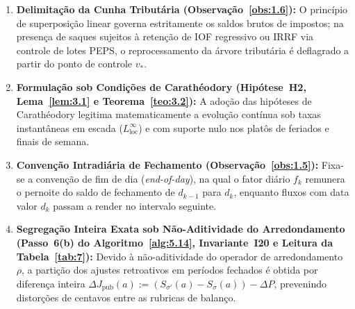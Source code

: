 \documentclass[11pt, a4paper]{article}
\theoremstyle{definition}
\theoremstyle{plain}
\theoremstyle{remark}
\begin{document}
\begin{enumerate}[label=\textbf{\arabic*.}]
    \item \textbf{Delimitação da Cunha Tributária (Observação~\ref{obs:1.6}):} O princípio de superposição linear governa estritamente os saldos brutos de impostos; na presença de saques sujeitos à retenção de IOF regressivo ou IRRF via controle de lotes PEPS, o reprocessamento da árvore tributária é deflagrado a partir do ponto de controle $v_*$.
    \item \textbf{Formulação sob Condições de Carathéodory (Hipótese~H2, Lema~\ref{lem:3.1} e Teorema~\ref{teo:3.2}):} A adoção das hipóteses de Carathéodory legitima matematicamente a evolução contínua sob taxas instantâneas em escada ($L^\infty_{\text{loc}}$) e com suporte nulo nos platôs de feriados e finais de semana.
    \item \textbf{Convenção Intradiária de Fechamento (Observação~\ref{obs:1.5}):} Fixa-se a convenção de fim de dia (\emph{end-of-day}), na qual o fator diário $f_k$ remunera o pernoite do saldo de fechamento de $d_{k-1}$ para $d_k$, enquanto fluxos com data valor $d_k$ passam a render no intervalo seguinte.
    \item \textbf{Segregação Inteira Exata sob Não-Aditividade do Arredondamento (Passo~6(b) do Algoritmo~\ref{alg:5.14}, Invariante~I20 e Leitura da Tabela~\ref{tab:7}):} Devido à não-aditividade do operador de arredondamento $\rho$, a partição dos ajustes retroativos em períodos fechados é obtida por diferença inteira $\Delta J_{\text{pub}}(a) := (S_{\sigma'}(a) - S_\sigma(a)) - \Delta P$, prevenindo distorções de centavos entre as rubricas de balanço.
\end{enumerate}
\end{document}
